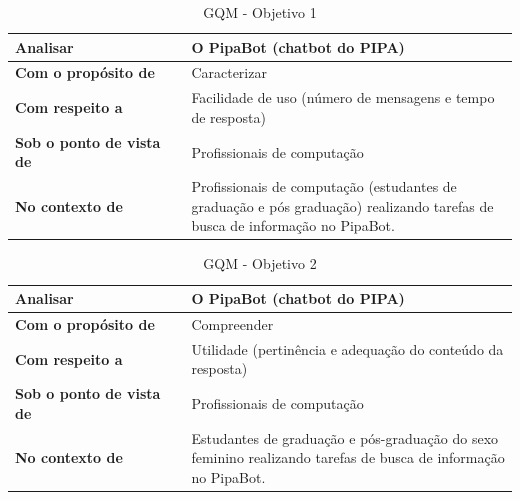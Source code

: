   \begin{center}
  	\begin{table}[h!]
  		\begin{tabular}{ | m{0.35\linewidth} | m{0.65\linewidth} | } 
  			\hline
  			\textbf{Analisar} & O PipaBot (chatbot do PIPA) \\ 
  			\hline
  			\textbf{Com o propósito de} & Caracterizar \\ 
  			\hline
  			\textbf{Com respeito a} & Facilidade de uso (número de mensagens e tempo de resposta) \\ 
  			\hline
  			\textbf{Sob o ponto de vista de} & Profissionais de computação \\
  			\hline
  			\textbf{No contexto de} & Profissionais de computação (estudantes de graduação e pós graduação) realizando tarefas de busca de informação no PipaBot. \\
  			\hline
  		\end{tabular}
  	  \caption{GQM - Objetivo 1}
  	  \label{tab:obj1}  	  
  	\end{table}
  \end{center}

	\begin{center}
		\begin{table}[h!]
			\begin{tabular}{ | m{0.35\linewidth} | m{0.65\linewidth} | } 
				\hline
				\textbf{Analisar} & O PipaBot (chatbot do PIPA) \\ 
				\hline
				\textbf{Com o propósito de} & Compreender \\ 
				\hline
				\textbf{Com respeito a} & Utilidade (pertinência e adequação do conteúdo da resposta) \\ 
				\hline
				\textbf{Sob o ponto de vista de} & Profissionais de computação \\
				\hline
				\textbf{No contexto de} & Estudantes de graduação e pós-graduação do sexo feminino realizando tarefas de busca de informação no PipaBot. \\
				\hline
			\end{tabular}
			\caption{GQM - Objetivo 2}
			\label{tab:obj2}
		\end{table}
	\end{center}
	
